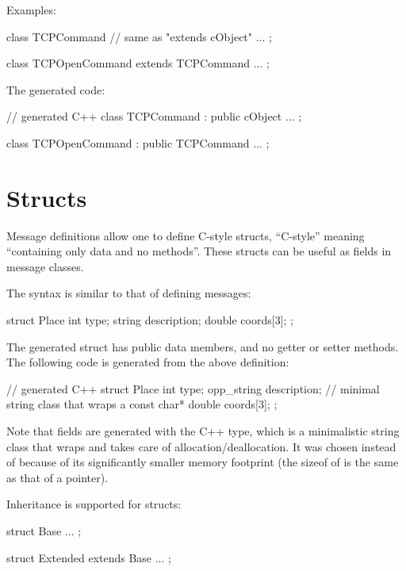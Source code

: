 Examples:

\begin{msg}
class TCPCommand  // same as "extends cObject"
{
    ...
};

class TCPOpenCommand extends TCPCommand
{
    ...
};
\end{msg}

The generated code:

\begin{cpp}
// generated C++
class TCPCommand : public cObject
{
    ...
};

class TCPOpenCommand : public TCPCommand
{
    ...
};
\end{cpp}


\section{Structs}
\label{sec:msg-defs:defining-structs}

Message definitions allow one to define C-style structs, ``C-style''
meaning ``containing only data and no methods''. These structs can be
useful as fields in message classes.

The syntax is similar to that of defining messages:

\begin{msg}
struct Place
{
    int type;
    string description;
    double coords[3];
};
\end{msg}

The generated struct has public data members, and no getter or setter
methods. The following code is generated from the above definition:

\begin{cpp}
// generated C++
struct Place
{
    int type;
    opp_string description; // minimal string class that wraps a const char*
    double coords[3];
};
\end{cpp}

Note that  fields are generated with the 
C++ type, which is a minimalistic string class that wraps 
and takes care of allocation/deallocation. It was chosen instead of
 because of its significantly smaller memory footprint
(the sizeof of  is the same as that of a 
pointer).

Inheritance is supported for structs:

\begin{msg}
struct Base
{
    ...
};

struct Extended extends Base
{
    ...
};
\end{msg}

